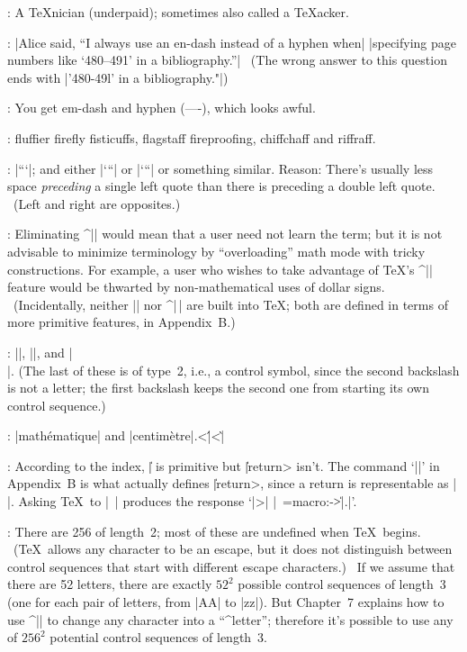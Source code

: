 
:
 A \TeX nician (underpaid); sometimes also called a \TeX acker.

:
 |Alice said, ``I always use an en-dash instead of a hyphen when|\break
|specifying page numbers like `480--491' in a bibliography.''| \
(The wrong answer to this question ends with |'480-49l' in a bibliography."|)

:
 You get em-dash and hyphen (----), which looks awful.

:
 fluffier firefly fisticuffs, flagstaff fireproofing,
chiffchaff and riffraff.

:
 |``\thinspace`|; and either |`{}``| or |{`}``| or something similar.
Reason: There's usually less space {\sl preceding\/} a single left quote than
there is preceding a double left quote. \ (Left and right are opposites.)

:
 Eliminating ^|\thinspace| would mean that a user need not learn
the term; but it is not advisable to minimize terminology by ``overloading''
math mode with tricky constructions. For example, a user who wishes to
take advantage of \TeX's ^|\mathsurround| feature would be thwarted by
non-mathematical uses of dollar signs. \ (Incidentally, neither |\thinspace|
nor ^|\,| are built into \TeX; both are defined in terms of more
primitive features, in Appendix~B.)

:
 |\I|, |\exercise|, and |\\|. (The last of these is of type~2, i.e.,
a control symbol, since the second backslash is not a letter; the first
backslash keeps the second one from starting its own control sequence.)

:
 |math\'ematique| and |centim\`etre|.^^|\'|^^|\`|

:
 According to the index, |\|\] is primitive but
|\|\<return> isn't. The command `|\def\^^M{\ }|' in
Appendix~B is what actually defines |\|\<return>, since a
return is representable as |^^M|. Asking \TeX\ to |\show\^^M|
produces the response `|>| |\^^M=macro:->\|\]|.|'.

:
 There are 256 of length~2; most of these are undefined when \TeX\
begins. \ (\TeX\ allows any character to be an escape, but it does not
distinguish between control sequences that start with different escape
characters.) \
If we assume that there are 52 letters, there are exactly $52^2$
possible control sequences of length~3 (one for each pair of letters, from
|AA| to |zz|). But Chapter~7 explains how to use ^|\catcode| to change any
character into a ``^{letter}''; therefore it's possible to use any of
$256^2$ potential control sequences of length~3.

